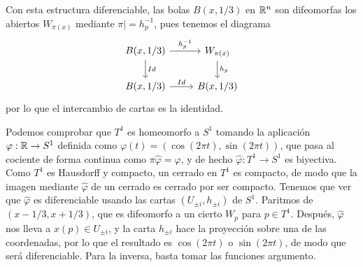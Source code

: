 \documentclass[twoside]{article}
\begin{document}
\begin{solucion}
Con esta estructura diferenciable, las bolas $B(x,1/3)$ en $\mathbb{R}^n$ son difeomorfas los abiertos $W_{\pi(x)}$ mediante $\pi|=h_p^{-1}$, pues tenemos el diagrama
\[
\begin{tikzcd}
B(x,1/3)\arrow[r, "h_p^{-1}"]\arrow[d, "Id"] & W_{\pi(x)}\arrow[d, "h_p"]\\
B(x,1/3)\arrow[r, "Id"]& B(x,1/3)
\end{tikzcd}
\]
por lo que el intercambio de cartas es la identidad.


Podemos comprobar que $T^1$ es homeomorfo a $S^1$ tomando la aplicación $\varphi:\mathbb{R}\to S^1$ definida como $\varphi(t)=(\cos(2\pi t), \sin(2\pi t))$, que pasa al cociente de forma continua como $\pi\hat{\varphi}=\varphi$, y de hecho $\hat{\varphi}:T^1\to S^1$ es biyectiva. Como $T^1$ es Hausdorff y compacto, un cerrado en $T^1$ es compacto, de modo que la imagen mediante $\hat{\varphi}$ de un cerrado es cerrado por ser compacto. Tenemos que ver que $\hat{\varphi}$ es diferenciable usando las cartas $(U_{\pm i}, h_{\pm i})$ de $S^1$.  Paritmos de $(x-1/3,x+1/3)$, que es difeomorfo a un cierto $W_p$ para $p\in T^1$. Después, $\hat{\varphi}$ nos lleva a $x(p)\in U_{\pm i}$, y la carta $h_{\pm i}$ hace la proyección sobre una de las coordenadas, por lo que el resultado es $\cos(2\pi t)$ o $\sin(2\pi t)$, de modo que será diferenciable. Para la inversa, basta tomar las funciones argumento.
\end{solucion}

\newpage
\end{document}
